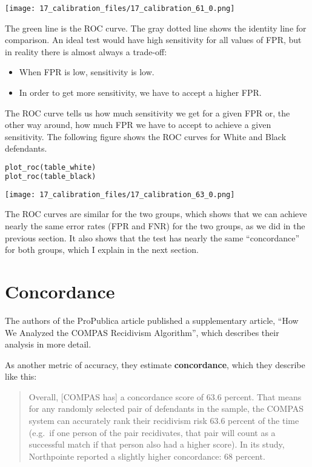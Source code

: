 \begin{center}
\texttt{[image: 17\_calibration\_files/17\_calibration\_61\_0.png]}
\end{center}

The green line is the ROC curve. The gray dotted line shows the identity
line for comparison. An ideal test would have high sensitivity for all
values of FPR, but in reality there is almost always a trade-off:

\begin{itemize}
\item
  When FPR is low, sensitivity is low.
\item
  In order to get more sensitivity, we have to accept a higher FPR.
\end{itemize}

The ROC curve tells us how much sensitivity we get for a given FPR or,
the other way around, how much FPR we have to accept to achieve a given
sensitivity. The following figure shows the ROC curves for White and
Black defendants.

\begin{lstlisting}[language=Python,style=source]
plot_roc(table_white)
plot_roc(table_black)
\end{lstlisting}

\begin{center}
\texttt{[image: 17\_calibration\_files/17\_calibration\_63\_0.png]}
\end{center}

The ROC curves are similar for the two groups, which shows that we can
achieve nearly the same error rates (FPR and FNR) for the two groups, as
we did in the previous section. It also shows that the test has nearly
the same ``concordance'' for both groups, which I explain in the next
section.

\section{Concordance}\label{concordance}

The authors of the ProPublica article published a supplementary article,
``How We Analyzed the COMPAS Recidivism Algorithm'', which describes
their analysis in more detail.

As another metric of accuracy, they estimate \textbf{concordance}, which
they describe like this:

\begin{quote}
Overall, {[}COMPAS has{]} a concordance score of 63.6 percent. That
means for any randomly selected pair of defendants in the sample, the
COMPAS system can accurately rank their recidivism risk 63.6 percent of
the time (e.g.~if one person of the pair recidivates, that pair will
count as a successful match if that person also had a higher score). In
its study, Northpointe reported a slightly higher concordance: 68
percent.
\end{quote}

